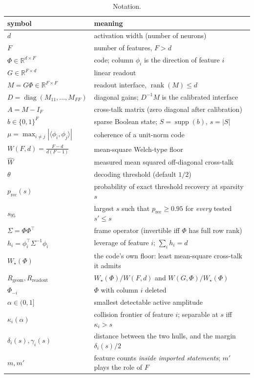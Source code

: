 \documentclass[preprint,12pt]{elsarticle}
\theoremstyle{definition}
\newcommand{\R}{\mathbb{R}}
\begin{document}
\begin{table}[t]
\centering
\caption{Notation.}
\label{tab:notation}
\small
\begin{tabular}{ll}
\toprule
symbol & meaning \\
\midrule
$d$ & activation width (number of neurons) \\
$F$ & number of features, $F>d$ \\
$\Phi\in\R^{d\times F}$ & code; column $\phi_i$ is the direction of feature $i$ \\
$G\in\R^{F\times d}$ & linear readout \\
$M=G\Phi\in\R^{F\times F}$ & readout interface, $\operatorname{rank}(M)\le d$ \\
$D=\operatorname{diag}(M_{11},\dots,M_{FF})$ & diagonal gains; $D^{-1}M$ is the calibrated interface \\
$A=M-I_F$ & cross-talk matrix (zero diagonal after calibration) \\
$b\in\{0,1\}^F$ & sparse Boolean state; $S=\operatorname{supp}(b)$, $s=|S|$ \\
$\mu=\max_{i\ne j}|\langle\phi_i,\phi_j\rangle|$ & coherence of a unit-norm code \\
$W(F,d)=\frac{F-d}{d(F-1)}$ & mean-square Welch-type floor \\
$\widehat W$ & measured mean squared off-diagonal cross-talk \\
$\theta$ & decoding threshold (default $1/2$) \\
$p_{\mathrm{rec}}(s)$ & probability of exact threshold recovery at sparsity $s$ \\
$s_{95}$ & largest $s$ such that $p_{\mathrm{rec}}\ge0.95$ for \emph{every} tested $s'\le s$ \\
$\Sigma=\Phi\Phi^{\top}$ & frame operator (invertible iff $\Phi$ has full row rank) \\
$h_i=\phi_i^{\top}\Sigma^{-1}\phi_i$ & leverage of feature $i$; $\sum_ih_i=d$ \\
$W_{\star}(\Phi)$ & the code's own floor: least mean-square cross-talk it admits \\
$R_{\mathrm{geom}},R_{\mathrm{readout}}$ & $W_{\star}(\Phi)/W(F,d)$ and $W(G,\Phi)/W_{\star}(\Phi)$ \\
$\Phi_{-i}$ & $\Phi$ with column $i$ deleted \\
$\alpha\in(0,1]$ & smallest detectable active amplitude \\
$\kappa_i(\alpha)$ & collision frontier of feature $i$; separable at $s$ iff $\kappa_i>s$ \\
$\delta_i(s),\gamma_i(s)$ & distance between the two hulls, and the margin $\delta_i(s)/2$ \\
$m,m'$ & feature counts \emph{inside imported statements}; $m'$ plays the role of $F$ \\
\bottomrule
\end{tabular}
\end{table}
\end{document}
